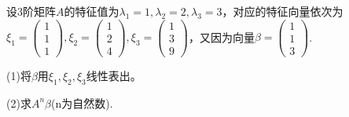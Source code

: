 \documentclass[a4paper]{report}
\begin{document}
\EX 设3阶矩阵$A$的特征值为$\lambda_1=1,\lambda_2=2,\lambda_3=3$，对应的特征向量依次为$
\xi_1=
\begin{pmatrix}
1\\1\\1
\end{pmatrix},\xi_2=
\begin{pmatrix}
1\\2\\4
\end{pmatrix},\xi_3=
\begin{pmatrix}
1\\3\\9
\end{pmatrix}
$，又因为向量$
\beta=
\begin{pmatrix}
1\\1\\3
\end{pmatrix}
$.

(1)将$\beta$用$\xi_1,\xi_2,\xi_3$线性表出。

(2)求$A^{n}\beta$(n为自然数).
\end{document}
